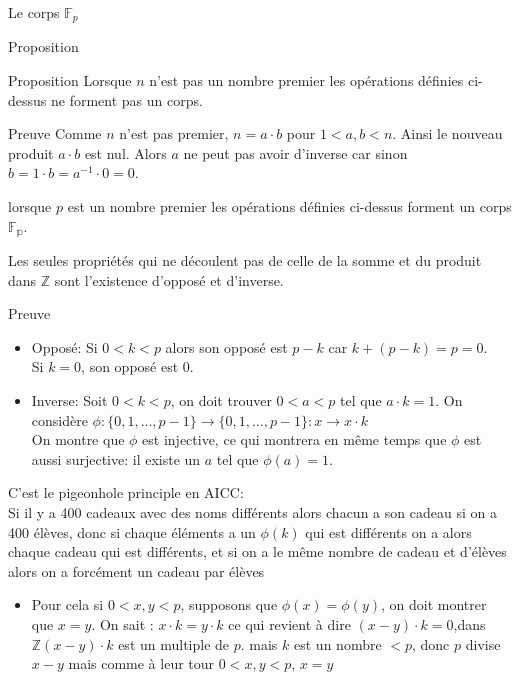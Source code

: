 \begin{parag}{Le corps $\mathbb{F}_p$}
\begin{subparag}{Proposition}
    \begin{theoreme}{Proposition}
        Lorsque $n$ n'est pas un nombre premier les opérations définies ci-dessus ne forment pas un corps.
    \end{theoreme}
\end{subparag}
\begin{subparag}{Preuve}
    Comme $n$ n'est pas premier, $n = a \cdot b$ pour $1 < a, b < n$.
    Ainsi le nouveau produit $a \cdot b$ est nul. Alors $a$ ne peut pas avoir d'inverse car sinon $b = 1 \cdot b = a^{-1} \cdot 0 = 0$.
\end{subparag}   
\begin{theoreme}
    lorsque $p$ est un nombre premier les opérations définies ci-dessus forment un corps $\mathbb{F_p}$.
\end{theoreme}
Les seules propriétés qui ne découlent pas de celle de la somme et du produit dans $\mathbb{Z}$ sont l'existence d'opposé et d'inverse.
\begin{subparag}{Preuve}
    \begin{itemize}
        \item Opposé: Si $0 < k < p$ alors son opposé est $p-k$ car $k + (p-k) = p = 0$.\\
        Si $k = 0$, son opposé est $0$.
        \item Inverse: Soit $0 < k < p$, on doit trouver $0 < a  < p$ tel que $a \cdot k = 1$. On considère $\phi : \{0, 1, \dots, p-1\} \to \{0, 1, \dots, p-1\} : x \to x \cdot k $\\
        On montre que $\phi$ est injective, ce qui montrera en même temps que $\phi$ est aussi surjective: il existe un $a$ tel que $\phi(a) = 1$.
    \end{itemize}
    \begin{framedremark}
        C'est le pigeonhole principle en AICC:
        \\
        Si il y a 400 cadeaux avec des noms différents alors chacun a son cadeau si on a 400 élèves, donc si chaque éléments a un $\phi(k)$ qui est différents on a alors chaque cadeau qui est différents, et si on a le même nombre de cadeau et d’élèves alors on a forcément un cadeau par élèves
    \end{framedremark}
    \begin{itemize}
        \item Pour cela si $0 < x, y<p$, supposons que $\phi(x) = \phi(y)$, on doit montrer que $x = y$. On sait : $x \cdot k = y \cdot k$ ce qui revient à dire $(x-y)\cdot k = 0$,dans $\mathbb{Z} (x-y)\cdot k$ est un multiple de $p$. mais $k$ est un nombre $< p$, donc $p$ divise $x - y$ mais comme à leur tour $0 < x, y < p$, $x = y$

\end{itemize}
\end{subparag}
\end{parag}
